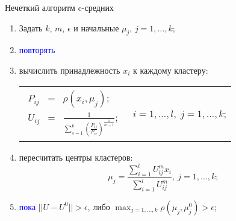 \documentclass[unicode, notheorems, pdf]{beamer}
\begin{document}
\begin{frame}{Нечеткий алгоритм c-средних}
	
	\begin{enumerate}
		\item Задать $k$, $m$, $\epsilon$ и начальные $\mu_j$, $j=1,\dots,k$;

		\item \textcolor{blue}{повторять}

		\item \hspace{.5cm} вычислить принадлежность $x_i$ к каждому кластеру:
		\begin{tabular}{c c}
		\parbox{.48\linewidth}{
			\setlength\arraycolsep{2pt}
			\begin{eqnarray*}
				P_{ij} &=& \rho(x_i,\mu_j);\\
				U_{ij} &=& \frac{1}{\sum_{s=1}^k \left( \frac{P_{ij}}{P_{is}} \right)^{\frac{1}{m-1}}};
			\end{eqnarray*}
		} & $i=1,\dots,l,\;j=1,\dots,k$;
		\end{tabular}

		\item \hspace{.5cm} пересчитать центры кластеров:
		\[\mu_{j}=\frac{\sum_{i=1}^{l} U_{ij}^m x_{i}}{\sum_{i=1}^{l} U_{ij}^m}, \: j=1,\dots,k;\]

		\item \textcolor{blue}{пока} $||U-U^0||>\epsilon$, либо $\displaystyle\max_{j=1,\dots,k} \rho(\mu_j,\mu_j^0)>\epsilon$;
	\end{enumerate}
\end{frame}
\end{document}
